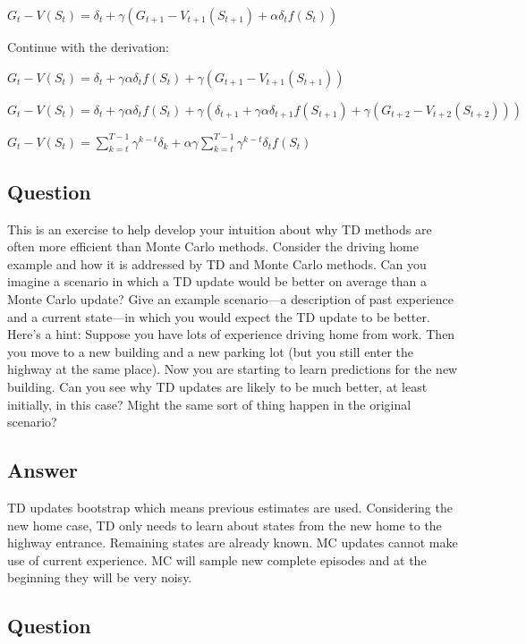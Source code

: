 \documentclass[11pt]{article}
\begin{document}
   $G_t-V(S_t) = \delta_t + \gamma (G_{t+1} - V_{t+1}(S_{t+1}) + \alpha \delta_t f(S_t)) $

    Continue with the derivation:

    $G_t-V(S_t) = \delta_t + \gamma \alpha \delta_t f(S_t) + \gamma (G_{t+1} - V_{t+1}(S_{t+1})) $

    $G_t-V(S_t) = \delta_t + \gamma \alpha \delta_t f(S_t) + \gamma (  \delta_{t+1} + \gamma \alpha \delta_{t+1} f(S_{t+1}) + \gamma (G_{t+2} - V_{t+2}(S_{t+2})) ) $

    $G_t-V(S_t) = \sum_{k=t}^{T-1} \gamma^{k-t} \delta_k + \alpha \gamma \sum_{k=t}^{T-1} \gamma^{k-t}  \delta_t f(S_t)$

    \subsection{Question}

    This is an exercise to help develop your intuition about why TD methods are often more efficient than Monte Carlo methods.
    Consider the driving home example and how it is addressed by TD and Monte Carlo methods.
    Can you imagine a scenario in which a TD update would be better on average than a Monte Carlo update?
    Give an example scenario—a description of past experience and a current state—in which you would expect the TD update to be better.
    Here’s a hint: Suppose you have lots of experience driving home from work.
    Then you move to a new building and a new parking lot (but you still enter the highway at the same place).
    Now you are starting to learn predictions for the new building.
    Can you see why TD updates are likely to be much better, at least initially, in this case?
    Might the same sort of thing happen in the original scenario?

     \subsection*{Answer}

    TD updates bootstrap which means previous estimates are used.
    Considering the new home case, TD only needs to learn about states from the new home to the highway entrance.
    Remaining states are already known.
    MC updates cannot make use of current experience.
    MC will sample new complete episodes and at the beginning they will be very noisy.


     \subsection{Question}
\end{document}
